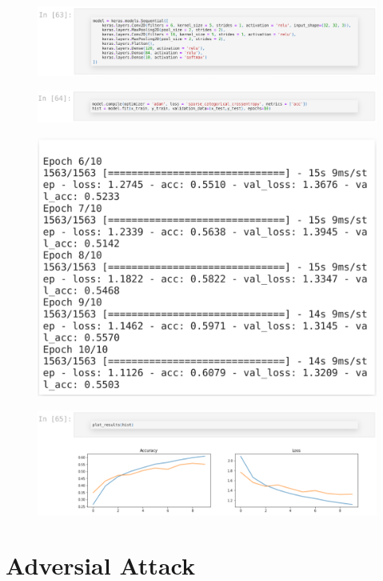 \documentclass{book}
\begin{document}
\begin{figure}[H]
    \centering
    \includegraphics[width=1.0\linewidth]{images/code14.png}
    \label{fig:code14}
\end{figure}
\begin{figure}[H]
    \centering
    \includegraphics[width=1.0\linewidth]{images/code15.png}
    \label{fig:code15}
\end{figure}
\begin{figure}[H]
    \centering
    \includegraphics[width=0.7\linewidth]{images/code16.png}
    \label{fig:code16}
\end{figure}
\begin{figure}[H]
    \centering
    \includegraphics[width=1.0\linewidth]{images/code17.png}
    \label{fig:code17}
\end{figure}

\chapter{Adversial Attack}
\end{document}
